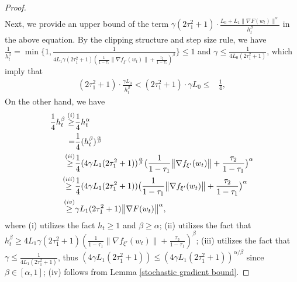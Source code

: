 \documentclass[10pt]{article} %
\newtheorem{proof}{Proof}
\begin{document}
\begin{proof}
\begin{align}
\end{align}
Next, we provide an upper bound of the term $\gamma(2\tau_1^2+1)\cdot \frac{L_0+L_1 \|\nabla F(w_t) \|^{\alpha}}{h_t^{\beta}}$ in the above equation.
By the clipping structure and step size rule, we have
$\frac{1}{h_t^{\beta}} = \min \big\{1, \frac{1}{4L_1\gamma(2\tau_1^2+1)(\frac{1}{1-\tau_1}\|\nabla f_{\xi'}(w_t)\|+\frac{\tau_2}{1-\tau_1})^{\beta}} \big \}\leq 1$ and $\gamma \leq \frac{1}{4L_0(2\tau_1^2+1)}$, which imply that
\begin{align}
    (2\tau_1^2+1)\cdot\frac{\gamma L_0}{h_t^{\beta}}<(2\tau_1^2+1)\cdot\gamma L_0\leq& \frac{1}{4}, \label{step size relation1}
\end{align}
On the other hand, we have
\begin{align}
\allowdisplaybreaks
    \frac{1}{4} h_t^{\beta}\overset{(i)}{\geq}& \frac{1}{4} h_t^{\alpha} \nonumber\\
    \overset{}{=}& \frac{1}{4} (h_t^{\beta})^{\frac{\alpha}{\beta}} \nonumber \\
    \overset{(ii)}{\geq}&\frac{1}{4} (4\gamma L_1(2\tau_1^2+1))^{\frac{\alpha}{\beta}}\big(\frac{1}{1-\tau_1}\big \|\nabla f_{\xi'}(w_t) \big \| + \frac{\tau_2}{1-\tau_1} \big)^{\alpha} \nonumber \\
    \overset{(iii)}{\geq}&\frac{1}{4} (4\gamma L_1(2\tau_1^2+1))\big(\frac{1}{1-\tau_1}\big \|\nabla f_{\xi'}(w_t) \big \| + \frac{\tau_2}{1-\tau_1} \big)^{\alpha} \nonumber \\
    \overset{(iv)}{\geq}& \gamma L_1(2\tau_1^2+1) \big \|\nabla F(w_t) \big \|^{\alpha}, \label{step size relation2}
\end{align}
where (i) utilizes the fact $h_t\geq 1$ and $\beta \geq \alpha$; (ii) utilizes the fact that $h_t^{\beta} \geq 4L_1 \gamma(2\tau_1^2+1) (\frac{1}{1-\tau_1} \big \|\nabla f_{\xi'}(w_t) \big \|+\frac{\tau_2}{1-\tau_1})^{\beta}$; (iii) utilizes the fact that $\gamma \leq \frac{1}{4L_1(2\tau_1^2+1)}$, thus $(4\gamma L_1(2\tau_1^2+1))\leq (4\gamma L_1(2\tau_1^2+1))^{\alpha/\beta}$ since $\beta \in [\alpha,1]$; (iv) follows from Lemma \ref{stochastic gradient bound}.


\end{proof}
\end{document}
